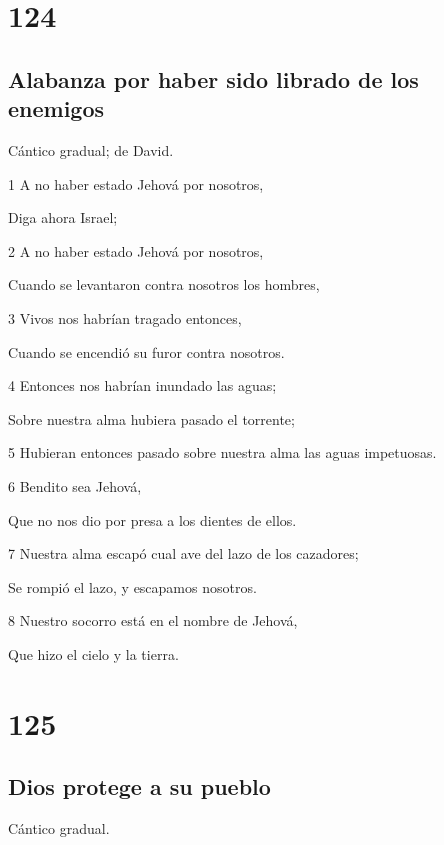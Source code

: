\chapter{124}

\section*{Alabanza por haber sido librado de los enemigos}

\par Cántico gradual; de David.

\par 1 A no haber estado Jehová por nosotros,
\par Diga ahora Israel;
\par 2 A no haber estado Jehová por nosotros,
\par Cuando se levantaron contra nosotros los hombres,
\par 3 Vivos nos habrían tragado entonces,
\par Cuando se encendió su furor contra nosotros.
\par 4 Entonces nos habrían inundado las aguas;
\par Sobre nuestra alma hubiera pasado el torrente;
\par 5 Hubieran entonces pasado sobre nuestra alma las aguas impetuosas.
\par 6 Bendito sea Jehová,
\par Que no nos dio por presa a los dientes de ellos.
\par 7 Nuestra alma escapó cual ave del lazo de los cazadores;
\par Se rompió el lazo, y escapamos nosotros.
\par 8 Nuestro socorro está en el nombre de Jehová,
\par Que hizo el cielo y la tierra.

\chapter{125}

\section*{Dios protege a su pueblo}

\par Cántico gradual.

